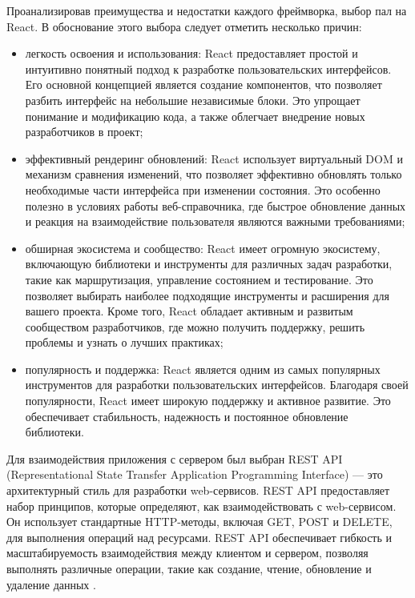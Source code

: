 Проанализировав преимущества и недостатки каждого фреймворка, выбор пал на React. В обоснование этого выбора следует отметить несколько причин:

\begin{itemize}
    \item легкость освоения и использования: React предоставляет простой и интуитивно понятный подход к разработке пользовательских интерфейсов. Его основной концепцией является создание компонентов, что позволяет разбить интерфейс на небольшие независимые блоки. Это упрощает понимание и модификацию кода, а также облегчает внедрение новых разработчиков в проект;
    \item эффективный рендеринг обновлений: React использует виртуальный DOM и механизм сравнения изменений, что позволяет эффективно обновлять только необходимые части интерфейса при изменении состояния. Это особенно полезно в условиях работы веб-справочника, где быстрое обновление данных и реакция на взаимодействие пользователя являются важными требованиями;
    \item обширная экосистема и сообщество: React имеет огромную экосистему, включающую библиотеки и инструменты для различных задач разработки, такие как маршрутизация, управление состоянием и тестирование. Это позволяет выбирать наиболее подходящие инструменты и расширения для вашего проекта. Кроме того, React обладает активным и развитым сообществом разработчиков, где можно получить поддержку, решить проблемы и узнать о лучших практиках;
    \item популярность и поддержка: React является одним из самых популярных инструментов для разработки пользовательских интерфейсов. Благодаря своей популярности, React имеет широкую поддержку и активное развитие. Это обеспечивает стабильность, надежность и постоянное обновление библиотеки.
\end{itemize}

Для взаимодействия приложения с сервером был выбран REST API (Representational State Transfer Application Programming Interface) — это архитектурный стиль для разработки web-сервисов. REST API предоставляет набор принципов, которые определяют, как взаимодействовать с web-сервисом. Он использует стандартные HTTP-методы, включая GET, POST и DELETE, для выполнения операций над ресурсами. REST API обеспечивает гибкость и масштабируемость взаимодействия между клиентом и сервером, позволяя выполнять различные операции, такие как создание, чтение, обновление и удаление данных \cite{API}.

